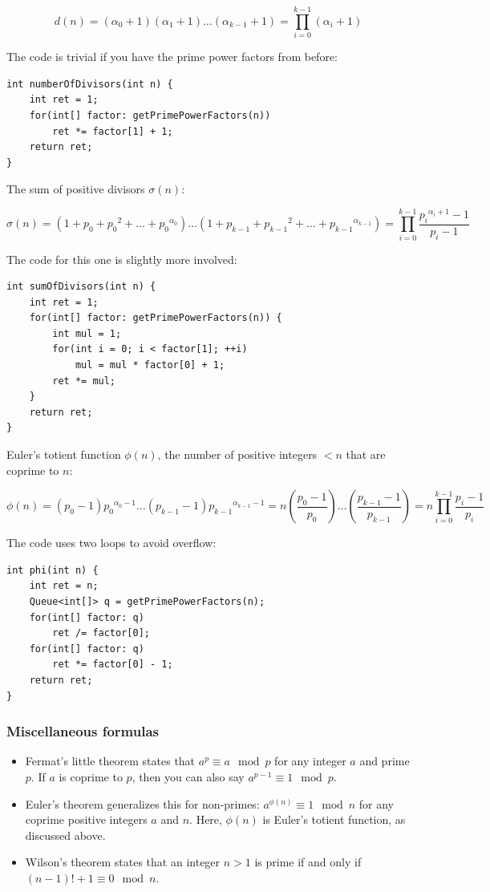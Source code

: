 \documentclass[a4paper,12pt]{article}
\begin{document}
\[d(n) = (\alpha_0 + 1)(\alpha_1 + 1)\ldots(\alpha_{k-1} + 1) = \prod_{i=0}^{k-1}{(\alpha_i+1)} \]

\noindent The code is trivial if you have the prime power factors from before:

\begin{lstlisting}
int numberOfDivisors(int n) {
	int ret = 1;
	for(int[] factor: getPrimePowerFactors(n))
		ret *= factor[1] + 1;
	return ret;
}
\end{lstlisting}

\noindent The sum of positive divisors $\sigma(n)$:

\[\sigma(n) = (1 + p_0 + {p_0}^2 + \ldots + {p_0}^{\alpha_0})\ldots(1 + p_{k-1} + {p_{k-1}}^2 + \ldots + {p_{k-1}}^{\alpha_{k-1}}) = \prod_{i=0}^{k-1}{\frac{{p_i}^{\alpha_i+1} - 1}{p_i - 1}} \]

\noindent The code for this one is slightly more involved:

\begin{lstlisting}
int sumOfDivisors(int n) {
	int ret = 1;
	for(int[] factor: getPrimePowerFactors(n)) {
		int mul = 1;
		for(int i = 0; i < factor[1]; ++i)
			mul = mul * factor[0] + 1;
		ret *= mul;
	}
	return ret;
}
\end{lstlisting}

\noindent Euler's totient function $\phi(n)$, the number of positive integers $<n$ that are coprime to $n$:

\[\phi(n) = (p_0 - 1){p_0}^{\alpha_0-1}\ldots(p_{k-1} - 1){p_{k-1}}^{\alpha_{k-1}-1} = n\left(\frac{p_0-1}{p_0}\right)\ldots\left(\frac{p_{k-1}-1}{p_{k-1}}\right) = n\prod_{i=0}^{k-1}{\frac{p_i - 1}{p_i}} \]

\noindent The code uses two loops to avoid overflow:

\begin{lstlisting}
int phi(int n) {
	int ret = n;
	Queue<int[]> q = getPrimePowerFactors(n);
	for(int[] factor: q)
		ret /= factor[0];
	for(int[] factor: q)
		ret *= factor[0] - 1;
	return ret;
}
\end{lstlisting}

\subsubsection{Miscellaneous formulas}
\begin{itemize}
\item Fermat's little theorem states that $a^p \equiv a \mod{p}$ for any integer $a$ and prime $p$. If $a$ is coprime to $p$, then you can also say $a^{p-1} \equiv 1 \mod{p}$.
\item Euler's theorem generalizes this for non-primes: $a^{\phi(n)} \equiv 1 \mod{n}$ for any coprime positive integers $a$ and $n$. Here, $\phi(n)$ is Euler's totient function, as discussed above.
\item Wilson's theorem states that an integer $n>1$ is prime if and only if $(n-1)!+1 \equiv 0 \mod{n}$.
\end{itemize}
\end{document}

